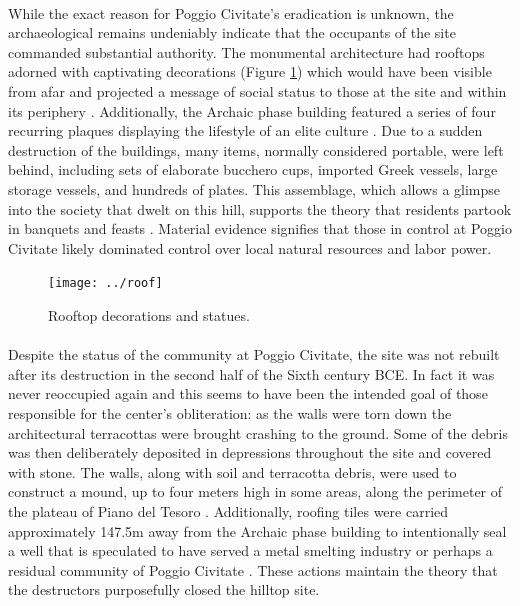 \documentclass[12pt,a4paper]{thesis}
\begin{document}

\paragraph{}
While the exact reason for Poggio Civitate's eradication is unknown, the archaeological remains undeniably indicate that the occupants of the site commanded substantial authority.  The monumental architecture had rooftops adorned with captivating decorations (Figure \ref{fig:roof}) which would have been visible from afar and projected a message of social status to those at the site and within its periphery \citep{Tuc06,Odo13}. Additionally, the Archaic phase building featured a series of four recurring plaques displaying the lifestyle of an elite culture \cite[159]{Win09}. Due to a sudden destruction of the buildings, many items, normally considered portable, were left behind, including sets of elaborate bucchero cups, imported Greek vessels, large storage vessels, and hundreds of plates. This assemblage, which allows a glimpse into the society that dwelt on this hill, supports the theory that residents partook in banquets and feasts \cite[162-166]{BarRas98}. Material evidence signifies that those in control at Poggio Civitate likely dominated control over local natural resources and labor power. 

\begin{figure}
\centering
\texttt{[image: ../roof]}
\caption[Rooftop decorations and statues]{Rooftop decorations and statues\footnotemark.}
\label{fig:roof}
\end{figure}


\paragraph{}
Despite the status of the community at Poggio Civitate, the site was not rebuilt after its destruction in the second half of the Sixth century BCE. In fact it was never reoccupied again and this seems to have been the intended goal of those responsible for the center's obliteration: as the walls were torn down the architectural terracottas were brought crashing to the ground. Some of the debris was then deliberately deposited in depressions throughout the site and covered with stone. The walls, along with soil and terracotta debris, were used to construct a mound, up to four meters high in some areas, along the perimeter of the plateau of Piano del Tesoro \citep{IEB94}. Additionally, roofing tiles were carried approximately 147.5m away from the Archaic phase building to intentionally seal a well that is speculated to have served a metal smelting industry or perhaps a residual community of Poggio Civitate \citep{TucBruHunTal10}. These actions maintain the theory that the destructors purposefully closed the hilltop site.
\end{document}
